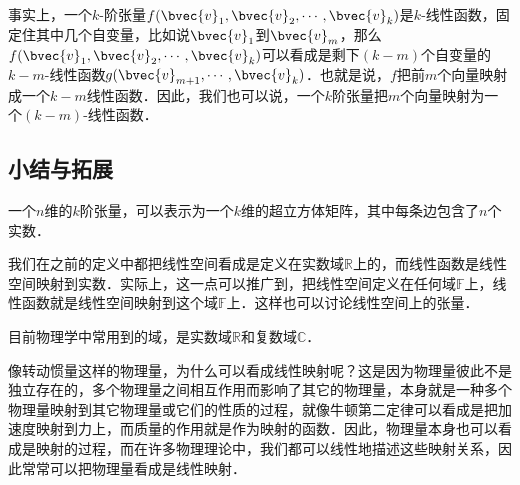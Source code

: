 事实上，一个$k$-阶张量$f(\bvec{v}_1, \bvec{v}_2, \cdots,\bvec{v}_k)$是$k$-线性函数，固定住其中几个自变量，比如说$\bvec{v}_1$到$\bvec{v}_m$，那么$f(\bvec{v}_1, \bvec{v}_2,\cdots,\bvec{v}_k)$可以看成是剩下$(k-m)$个自变量的$k-m$-线性函数$g(\bvec{v}_{m+1}, \cdots,\bvec{v}_k)$．也就是说，$f$把前$m$个向量映射成一个$k-m$线性函数．因此，我们也可以说，一个$k$阶张量把$m$个向量映射为一个$(k-m)$-线性函数．

\subsection{小结与拓展}

一个$n$维的$k$阶张量，可以表示为一个$k$维的超立方体矩阵，其中每条边包含了$n$个实数．

我们在之前的定义中都把线性空间看成是定义在实数域$\mathbb{R}$上的，而线性函数是线性空间映射到实数．实际上，这一点可以推广到，把线性空间定义在任何域$\mathbb{F}$上，线性函数就是线性空间映射到这个域$\mathbb{F}$上．这样也可以讨论线性空间上的张量．

目前物理学中常用到的域，是实数域$\mathbb{R}$和复数域$\mathbb{C}$．

像转动惯量这样的物理量，为什么可以看成线性映射呢？这是因为物理量彼此不是独立存在的，多个物理量之间相互作用而影响了其它的物理量，本身就是一种多个物理量映射到其它物理量或它们的性质的过程，就像牛顿第二定律可以看成是把加速度映射到力上，而质量的作用就是作为映射的函数．因此，物理量本身也可以看成是映射的过程，而在许多物理理论中，我们都可以线性地描述这些映射关系，因此常常可以把物理量看成是线性映射．







